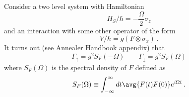 
Consider a two level system with Hamiltonian
\begin{equation*}
  H_S / \hbar = - \frac{\Omega}{2} \sigma_z
\end{equation*}
and an interaction with some other operator of the form
\begin{equation*}
  V / \hbar = g(F \otimes \sigma_x) \, .
\end{equation*}
It turns out (see Annealer Handbook appendix) that
\begin{equation*}
  \Gamma_\uparrow = g^2 S_F(- \Omega) \qquad \Gamma_\downarrow = g^2 S_F(\Omega)
\end{equation*}
where $S_F(\Omega)$ is the spectral density of $F$ defined as
\begin{equation*}
  S_F(\Omega) \equiv \int_{-\infty}^\infty dt \avg{F(t) F(0)} e^{i \Omega t} \, .
\end{equation*}


